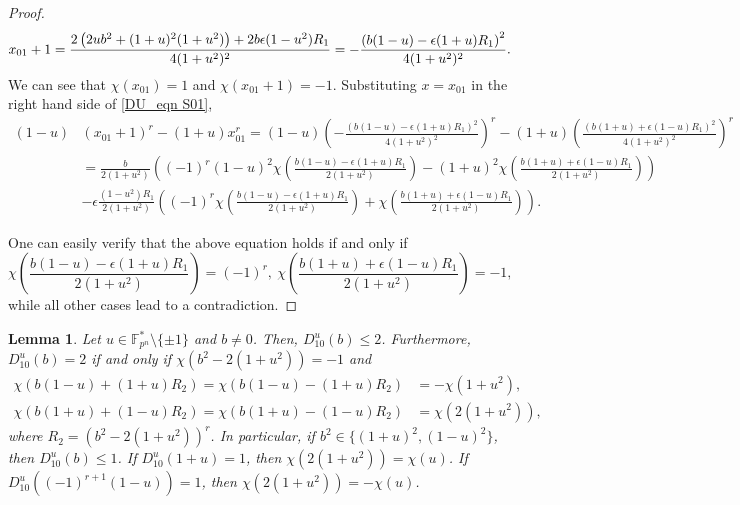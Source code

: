 \documentclass[11pt]{article}
\numberwithin{theorem}{section}
\newtheorem{lemma}[theorem]{Lemma}
\newcommand{\Fpnmul}{\mathbb{F}_{p^n}^*}
\begin{document}
\begin{proof}
\begin{equation*}
	x_{01}+1=\frac{2\left(2ub^2+(1+u)^2(1+u^2)\right)+2b\epsilon(1-u^2)R_1}{4(1+u^2)^2} \\
	=-\frac{\left( b(1-u)-\epsilon(1+u)R_1\right) ^2}{4(1+u^2)^2}.
\end{equation*}
We can see that $\chi(x_{01})=1$ and $\chi(x_{01}+1)=-1$. Substituting $x=x_{01}$ in the right hand side of \eqref{DU_eqn S01},
\begin{align*}
	(1- u)&(x_{01}+1)^r- (1+u)x_{01}^r = (1-u)\left( -\frac{\left( b(1-u)-\epsilon(1+u)R_1\right) ^2}{4(1+u^2)^2}\right) ^r - (1+u) \left( \frac{\left( b(1+u)+\epsilon(1-u)R_1\right) ^2}{4(1+u^2)^2} \right) ^r\\
	&=\frac{b}{2(1+u^2)}\left( (-1)^r (1-u)^2\chi\left( \frac{ b(1-u)-\epsilon(1+u)R_1}{2(1+u^2)}\right) -(1+u)^2\chi\left( \frac{ b(1+u)+\epsilon(1-u)R_1}{2(1+u^2)}\right) \right) \\
	&-\epsilon\frac{(1-u^2)R_1}{2(1+u^2)}\left( (-1)^r \chi\left( \frac{ b(1-u)-\epsilon(1+u)R_1}{2(1+u^2)}\right) +\chi\left( \frac{ b(1+u)+\epsilon(1-u)R_1}{2(1+u^2)}\right) \right).
\end{align*}

One can easily verify that the above equation holds if and only if 
	\begin{equation*}
		\chi\left( \frac{ b(1-u)-\epsilon(1+u)R_1}{2(1+u^2)}\right) = (-1)^r,\ \chi\left( \frac{ b(1+u)+\epsilon(1-u)R_1}{2(1+u^2)}\right)=-1,
	\end{equation*}
while all other cases lead to a contradiction.
\end{proof}


\begin{lemma}\label{DU_lemma S10}
	Let $u\in \Fpnmul \setminus \{\pm1\}$ and $b\ne 0$. Then, $D_{10}^u(b)\le 2$. Furthermore, $D_{10}^u(b) = 2$ if and only if $\chi(b^2-2(1+u^2))=-1$ and 
	\begin{align*}
		\chi(b(1-u)+(1+u)R_2) = \chi(b(1-u)-(1+u)R_2) &= -\chi(1+u^2),\\
		\chi(b(1+u)+(1-u)R_2) = \chi(b(1+u)-(1-u)R_2) &= \chi(2(1+u^2)),
	\end{align*}
	where $R_2  = (b^2-2(1+u^2))^r $. In particular, if $b^2\in \{(1+u)^2, (1-u)^2\}$, then $D_{10}^u(b)\le 1$. If $D_{10}^u(1+u)= 1$, then $\chi(2(1+u^2))=\chi(u)$. If $D_{10}^u((-1)^{r+1}(1-u))= 1$, then $\chi(2(1+u^2))=-\chi(u)$. 
\end{lemma}
\end{document}

